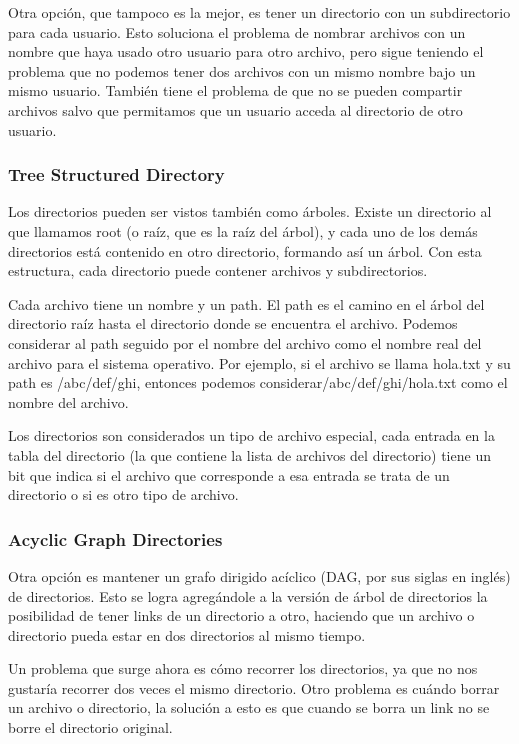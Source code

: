 \documentclass{article}
\begin{document}
Otra opci\'on, que tampoco es la mejor, es tener un directorio con un subdirectorio para cada usuario. Esto soluciona el problema de nombrar archivos con un nombre que haya usado otro usuario para otro archivo, pero sigue teniendo el problema que no podemos tener dos archivos con un mismo nombre bajo un mismo usuario. Tambi\'en tiene el problema de que no se pueden compartir archivos salvo que permitamos que un usuario acceda al directorio de otro usuario.

\subsubsection{Tree Structured Directory}

Los directorios pueden ser vistos tambi\'en como \'arboles. Existe un directorio al que llamamos root (o ra\'iz, que es la ra\'iz del \'arbol), y cada uno de los dem\'as directorios est\'a contenido en otro directorio, formando as\'i un \'arbol. Con esta estructura, cada directorio puede contener archivos y subdirectorios.

Cada archivo tiene un nombre y un path. El path es el camino en el \'arbol del directorio ra\'iz hasta el directorio donde se encuentra el archivo. Podemos considerar al path seguido por el nombre del archivo como el nombre real del archivo para el sistema operativo. Por ejemplo, si el archivo se llama hola.txt y su path es /abc/def/ghi, entonces podemos considerar/abc/def/ghi/hola.txt como el nombre del archivo.

Los directorios son considerados un tipo de archivo especial, cada entrada en la tabla del directorio (la que contiene la lista de archivos del directorio) tiene un bit que indica si el archivo que corresponde a esa entrada se trata de un directorio o si es otro tipo de archivo.

\subsubsection{Acyclic Graph Directories}

Otra opci\'on es mantener un grafo dirigido ac\'iclico (DAG, por sus siglas en ingl\'es) de directorios. Esto se logra agreg\'andole a la versi\'on de \'arbol de directorios la posibilidad de tener links de un directorio a otro, haciendo que un archivo o directorio pueda estar en dos directorios al mismo tiempo.

Un problema que surge ahora es c\'omo recorrer los directorios, ya que no nos gustar\'ia recorrer dos veces el mismo directorio. Otro problema es cu\'ando borrar un archivo o directorio, la soluci\'on a esto es que cuando se borra un link no se borre el directorio original.
\end{document}
